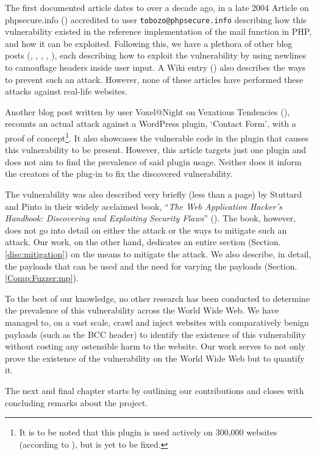 The first documented article dates to over a decade ago, in a late 2004 Article on phpsecure.info (\cite{Tobozo}) accredited to user \lstinline|tobozo@phpsecure.info| describing how this vulnerability existed in the reference implementation of the mail function in PHP, and how it can be exploited. Following this, we have a plethora of other blog posts (\cite{Calin}, \cite{DK}, \cite{Injection2}, \cite{Nicol}, \cite{Pope}), each describing how to exploit the vulnerability by using newlines to camouflage headers inside user input. A Wiki entry (\cite{Injection}) also describes the ways to prevent such an attack. However, none of these articles have performed these attacks against real-life websites.

Another blog post written by user Voxel@Night on Vexatious Tendencies (\cite{Tendencies2014}), recounts an actual attack against a WordPress plugin, `Contact Form', with a proof of concept\footnote{It is to be noted that this plugin is used actively on 300,000 websites (according to \cite{BestWebSoft2016}), but is yet to be fixed.}. It also showcases the vulnerable code in the plugin that causes this vulnerability to be present. However, this article targets just one plugin and does not aim to find the prevalence of said plugin usage. Neither does it inform the creators of the plug-in to fix the discovered vulnerability.

The vulnerability was also described very briefly (less than a page) by Stuttard and Pinto in their widely acclaimed book, ``\emph{The Web Application Hacker's Handbook: Discovering and Exploiting Security Flaws}'' (\cite{stuttard2011web}). The book, however, does not go into detail on either the attack or the ways to mitigate such an attack. Our work, on the other hand, dedicates an entire section (Section. \ref{disc:mitigation}) on the means to mitigate the attack. We also describe, in detail, the payloads that can be used and the need for varying the payloads (Section. \ref{Comp:Fuzzer:mp}).

To the best of our knowledge, no other research has been conducted to determine the prevalence of this vulnerability across the World Wide Web. We have managed to,  on a vast scale, crawl and inject websites with comparatively benign payloads (such as the BCC header) to identify the existence of this vulnerability without costing any ostensible harm to the website. Our work serves to not only prove the existence of the vulnerability on the World Wide Web but to quantify it.

The next and final chapter starts by outlining our contributions and closes with concluding remarks about the project.